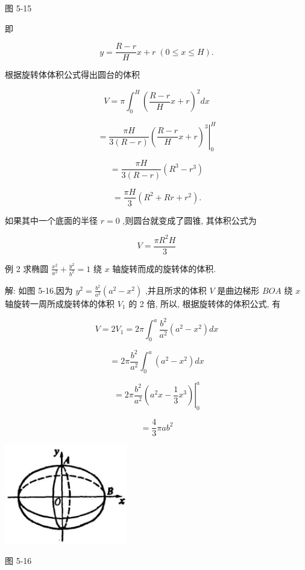 \documentclass[10pt]{article}
\begin{document}
图 5-15

即

\[
y = \frac{R - r}{H}x + r\;\left( {0 \leq x \leq H}\right) .
\]

根据旋转体体积公式得出圆台的体积

\[
V = \pi {\int }_{0}^{H}{\left( \frac{R - r}{H}x + r\right) }^{2}{dx}
\]

\[
= {\left. \frac{\pi H}{3\left( {R - r}\right) }{\left( \frac{R - r}{H}x + r\right) }^{3}\right| }_{0}^{H}
\]

\[
= \frac{\pi H}{3\left( {R - r}\right) }\left( {{R}^{3} - {r}^{3}}\right)
\]

\[
= \frac{\pi H}{3}\left( {{R}^{2} + {Rr} + {r}^{2}}\right) \text{.}
\]

如果其中一个底面的半径 \(r = 0\) ,则圆台就变成了圆锥, 其体积公式为

\[
V = \frac{\pi {R}^{2}H}{3}
\]

例 2 求椭圆 \(\frac{{x}^{2}}{{a}^{2}} + \frac{{y}^{2}}{{b}^{2}} = 1\) 绕 \(x\) 轴旋转而成的旋转体的体积.

解: 如图 5-16,因为 \({y}^{2} = \frac{{b}^{2}}{{a}^{2}}\left( {{a}^{2} - {x}^{2}}\right)\) ,并且所求的体积 \(V\) 是曲边梯形 \({BOA}\) 绕 \(x\) 轴旋转一周所成旋转体的体积 \({V}_{1}\) 的 2 倍, 所以, 根据旋转体的体积公式, 有

\[
V = 2{V}_{1} = {2\pi }{\int }_{0}^{a}\frac{{b}^{2}}{{a}^{2}}\left( {{a}^{2} - {x}^{2}}\right) {dx}
\]

\[
= {2\pi }\frac{{b}^{2}}{{a}^{2}}{\int }_{0}^{a}\left( {{a}^{2} - {x}^{2}}\right) {dx}
\]

\[
= {\left. 2\pi \frac{{b}^{2}}{{a}^{2}}\left( {a}^{2}x - \frac{1}{3}{x}^{3}\right) \right| }_{0}^{a}
\]

\[
= \frac{4}{3}{\pi a}{b}^{2}
\]

\begin{center}
\includegraphics[max width=0.4\textwidth]{images/01912c18-5c3f-733d-b775-749ba9897a9d_238_905216.jpg}
\end{center}

图 5-16
\end{document}
